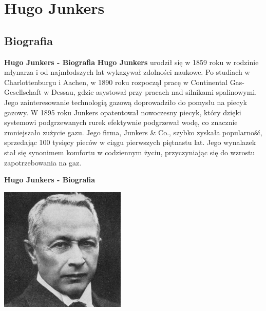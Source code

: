 \section{ \textbf{Hugo Junkers}}

\subsection{Biografia}
\begin{frame}{\textbf{Hugo Junkers - Biografia}}
\textbf{Hugo Junkers} urodził się w 1859 roku w rodzinie młynarza i od najmłodszych lat wykazywał zdolności naukowe. Po studiach w Charlottenburgu i Aachen, w 1890 roku rozpoczął pracę w Continental Gas-Gesellschaft w Dessau, gdzie asystował przy pracach nad silnikami spalinowymi. Jego zainteresowanie technologią gazową doprowadziło do pomysłu na piecyk gazowy.
W 1895 roku Junkers opatentował nowoczesny piecyk, który dzięki systemowi podgrzewanych rurek efektywnie podgrzewał wodę, co znacznie zmniejszało zużycie gazu. Jego firma, Junkers \& Co., szybko zyskała popularność, sprzedając 100 tysięcy pieców w ciągu pierwszych piętnastu lat. Jego wynalazek stał się synonimem komfortu w codziennym życiu, przyczyniając się do wzrostu zapotrzebowania na gaz.
\end{frame}

\begin{frame}{\textbf{Hugo Junkers - Biografia}}
	\begin{center}
	\includegraphics[width=6cm]{images/hugo-01.jpg}
	\end{center}
\end{frame}

